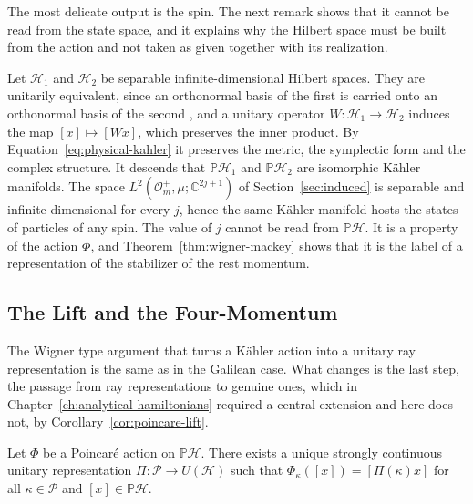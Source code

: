 	The most delicate output is the spin. The next remark shows that it cannot be read from the state space, and it explains why the Hilbert space must be built from the action and not taken as given together with its realization.
	
	\begin{remark}\label{rem:ph-no-spin}
		Let $\mathcal{H}_1$ and $\mathcal{H}_2$ be separable infinite-dimensional Hilbert spaces. They are unitarily equivalent, since an orthonormal basis of the first is carried onto an orthonormal basis of the second \cite[TODO-location]{TODO-Mor18}, and a unitary operator $W:\mathcal{H}_1\to\mathcal{H}_2$ induces the map $[x]\mapsto[Wx]$, which preserves the inner product. By Equation~\eqref{eq:physical-kahler} it preserves the metric, the symplectic form and the complex structure. It descends that $\mathbb{P}\mathcal{H}_1$ and $\mathbb{P}\mathcal{H}_2$ are isomorphic Kähler manifolds. The space $L^2(\mathcal{O}_m^+,\mu;\mathbb{C}^{2j+1})$ of Section~\ref{sec:induced} is separable and infinite-dimensional for every $j$, hence the same Kähler manifold hosts the states of particles of any spin. The value of $j$ cannot be read from $\mathbb{P}\mathcal{H}$. It is a property of the action $\Phi$, and Theorem~\ref{thm:wigner-mackey} shows that it is the label of a representation of the stabilizer of the rest momentum.
	\end{remark}
	
	\subsection{The Lift and the Four-Momentum}\label{subsec:poincare-lift}
	
	The Wigner type argument that turns a Kähler action into a unitary ray representation is the same as in the Galilean case. What changes is the last step, the passage from ray representations to genuine ones, which in Chapter~\ref{ch:analytical-hamiltonians} required a central extension and here does not, by Corollary~\ref{cor:poincare-lift}.
	
	\begin{proposition}\label{prop:poincare-lift}
		Let $\Phi$ be a Poincar\'e action on $\mathbb{P}\mathcal{H}$. There exists a unique strongly continuous unitary representation $\Pi:\mathcal{P}\to U(\mathcal{H})$ such that $\Phi_\kappa([x])=[\Pi(\kappa)x]$ for all $\kappa\in\mathcal{P}$ and $[x]\in\mathbb{P}\mathcal{H}$.
	\end{proposition}
	
